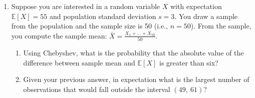 \documentclass[10pt,letterpaper]{article}
\theoremstyle{definition}
\numberwithin{equation}{section}
\begin{document}
\begin{enumerate}[I]
\begin{enumerate}[1)]
\begin{enumerate}[a)]
\end{enumerate}




\pagebreak
\item Suppose you are interested in a random variable $X$ with expectation $\mathbb{E}[X]=55$ and population standard deviation $s=3$. You draw a sample from the population and the sample size is 50 (i.e., $n=50$). From the sample, you compute the sample mean: $\bar{X} = \frac{X_{1} + ... + X_{50}}{50}$.
\begin{enumerate}
\item Using Chebyshev, what is the probability that the absolute value of the difference between sample mean and $\mathbb{E}[X]$ is greater than six?
\vfill

\item Given your previous answer, in expectation what is the largest number of observations that would fall outside the interval $(49,\ 61)$?
\vfill


\end{enumerate}
\end{enumerate}
\end{enumerate}
\end{document}
